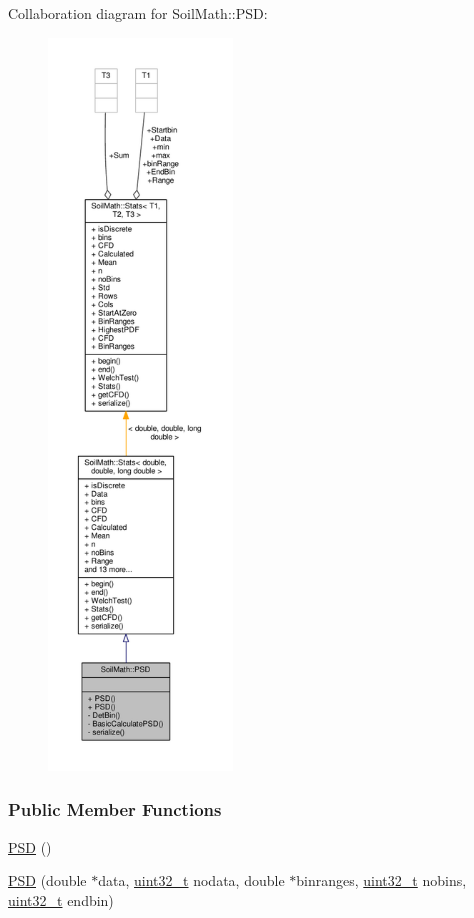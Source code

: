 Collaboration diagram for Soil\+Math\+:\+:P\+S\+D\+:
\nopagebreak
\begin{figure}[H]
\begin{center}
\leavevmode
\includegraphics[height=550pt]{class_soil_math_1_1_p_s_d__coll__graph}
\end{center}
\end{figure}
\subsubsection*{Public Member Functions}
\begin{DoxyCompactItemize}
\item 
\hyperlink{class_soil_math_1_1_p_s_d_aa19d9f4a6b79dd5c36024cf143f499c8}{P\+S\+D} ()
\item 
\hyperlink{class_soil_math_1_1_p_s_d_a80f35959df186e0f69b1afc32098741a}{P\+S\+D} (double $\ast$data, \hyperlink{_soil_math_types_8h_a435d1572bf3f880d55459d9805097f62}{uint32\+\_\+t} nodata, double $\ast$binranges, \hyperlink{_soil_math_types_8h_a435d1572bf3f880d55459d9805097f62}{uint32\+\_\+t} nobins, \hyperlink{_soil_math_types_8h_a435d1572bf3f880d55459d9805097f62}{uint32\+\_\+t} endbin)
\end{DoxyCompactItemize}
